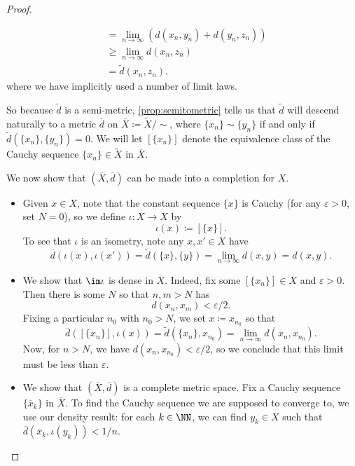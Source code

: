 \documentclass[../notes.tex]{subfiles}
\begin{document}
\begin{proof}
\begin{itemize}
\begin{align*}
			&= \lim_{n\to\infty}(d(x_n,y_n)+d(y_n,z_n)) \\
			&\ge \lim_{n\to\infty}d(x_n,z_n) \\
			&= \widetilde d(x_n,z_n),
		\end{align*}
		where we have implicitly used a number of limit laws.
	\end{itemize}
	So because $\widetilde d$ is a semi-metric, \autoref{prop:semitometric} tells us that $\widetilde d$ will descend naturally to a metric $\overline d$ on $\overline X\coloneqq\widetilde X/{\sim}$, where $\{x_n\}\sim\{y_n\}$ if and only if $\widetilde d(\{x_n\},\{y_n\})=0$. We will let $[\{x_n\}]$ denote the equivalence class of the Cauchy sequence $\{x_n\}\in\widetilde X$ in $\overline X$.

	We now show that $(\overline X,\overline d)$ can be made into a completion for $X$.
	\begin{itemize}
		\item Given $x\in X$, note that the constant sequence $\{x\}$ is Cauchy (for any $\varepsilon>0$, set $N=0$), so we define $\iota\colon X\to\overline X$ by
		\[\iota(x)\coloneqq[\{x\}].\]
		To see that $\iota$ is an isometry, note any $x,x'\in X$ have
		\[\overline d(\iota(x),\iota(x'))=\widetilde d(\{x\},\{y\})=\lim_{n\to\infty}d(x,y)=d(x,y).\]
		\item We show that $\im\iota$ is dense in $\overline X$. Indeed, fix some $[\{x_n\}]\in\overline X$ and $\varepsilon>0$. Then there is some $N$ so that $n,m>N$ has
		\[d(x_n,x_m)<\varepsilon/2.\]
		Fixing a particular $n_0$ with $n_0>N$, we set $x\coloneqq x_{n_0}$ so that
		\[\overline d([\{x_n\}],\iota(x))=\widetilde d(\{x_n\},x_{n_0})=\lim_{n\to\infty}d(x_n,x_{n_0}).\]
		Now, for $n>N$, we have $d(x_n,x_{n_0})<\varepsilon/2$, so we conclude that this limit must be less than $\varepsilon$.
		\item We show that $(\overline X,\overline d)$ is a complete metric space. Fix a Cauchy sequence $\{\overline x_k\}$ in $\overline X$. To find the Cauchy sequence we are supposed to converge to, we use our density result: for each $k\in\NN$, we can find $y_k\in X$ such that $\overline d(\overline x_k,\iota(y_k))<1/n$.


\end{itemize}
\end{proof}
\end{document}
